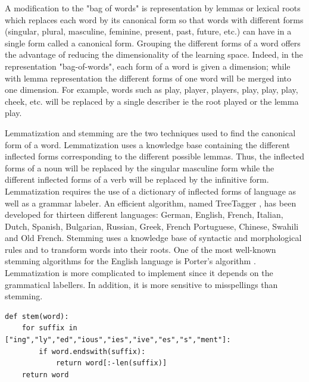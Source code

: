 
A modification to the "bag of words" is representation by lemmas or lexical roots which replaces  each word by its canonical form so that words with different
forms (singular, plural, masculine, feminine, present, past,
future, etc.) can have in a single form called a canonical form.
Grouping the different forms of a word offers the advantage of  reducing the dimensionality of the learning space. Indeed, in the representation "bag-of-words", each form of a word is given a dimension; while with lemma representation the different forms of one word will be merged into one dimension. For example, words such as play, player, players, play, play, play, cheek, etc. will be replaced by a single describer ie the root played or the lemma play.


Lemmatization and stemming are the two techniques used to find the canonical form of a word. Lemmatization uses a knowledge base containing the different inflected forms corresponding to the different possible lemmas. Thus, the inflected forms of a noun will be replaced by the singular masculine form while the different inflected forms of a verb will be replaced by the infinitive form. Lemmatization requires the use of a dictionary of inflected forms of language as well as a grammar labeler. An efficient algorithm, named TreeTagger \citep{schmid1994probabilistic}, has been developed for thirteen different languages: German, English, French, Italian, Dutch, Spanish, Bulgarian, Russian, Greek, French Portuguese, Chinese, Swahili and Old French. Stemming uses a knowledge base of syntactic and morphological rules and to transform words into their roots. One of the most well-known stemming algorithms for the English language is Porter's algorithm \citep{porter1980algorithm}. Lemmatization is more complicated to implement since it depends on the grammatical labellers. In addition, it is more sensitive to misspellings than stemming.

\begin{lstlisting}
def stem(word):
    for suffix in ["ing","ly","ed","ious","ies","ive","es","s","ment"]:
        if word.endswith(suffix):
            return word[:-len(suffix)]
    return word
\end{lstlisting}


